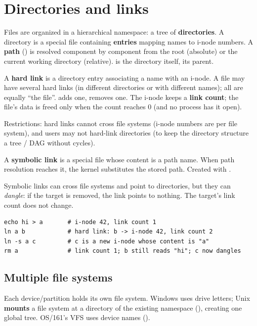 \section{Directories and links}

Files are organized in a hierarchical namespace: a tree of \textbf{directories}. A directory is
a special file containing \textbf{entries} mapping names to i-node numbers. A \textbf{path}
() is resolved component by component from the root (absolute) or the
current working directory (relative).  is the directory itself,  its parent.

\begin{definition}
A \textbf{hard link} is a directory entry associating a name with an i-node. A file may have
several hard links (in different directories or with different names); all are equally ``the
file''.  adds one,  removes one. The i-node keeps a
\textbf{link count}; the file's data is freed only when the count reaches 0 (and no process has it
open).
\end{definition}
Restrictions: hard links cannot cross file systems (i-node numbers are per file system), and
users may not hard-link directories (to keep the directory structure a tree / DAG without
cycles).

\begin{definition}
A \textbf{symbolic link} is a special file whose content is a path name. When path resolution
reaches it, the kernel substitutes the stored path. Created with .
\end{definition}
Symbolic links can cross file systems and point to directories, but they can \emph{dangle}: if the
target is removed, the link points to nothing. The target's link count does not change.

\begin{example}
\begin{lstlisting}[style=bash]
echo hi > a       # i-node 42, link count 1
ln a b            # hard link: b -> i-node 42, link count 2
ln -s a c         # c is a new i-node whose content is "a"
rm a              # link count 1; b still reads "hi"; c now dangles
\end{lstlisting}
\end{example}

\subsection*{Multiple file systems}
Each device/partition holds its own file system. Windows uses drive letters; Unix
\textbf{mounts} a file system at a directory of the existing namespace (), creating one global tree. OS/161's VFS uses device names ().

